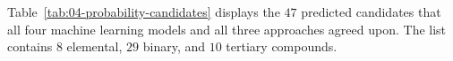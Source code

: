 \documentclass[superscriptaddress,unsortedaddress,
 amsmath,amssymb,
 aps,
]{revtex4-2}
\begin{document}


Table~\ref{tab:04-probability-candidates} displays the $47$ predicted candidates that all four machine learning models and all three approaches agreed upon. The list contains $8$ elemental, $29$ binary, and $10$ tertiary compounds.




\end{document}
